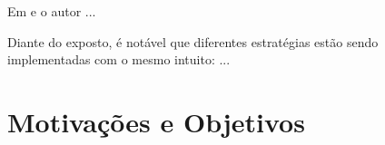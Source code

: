 Em \cite{Y_HORI_01} e \cite{Y_HORI_02} o autor ...


Diante do exposto, é notável que diferentes estratégias estão sendo implementadas com o mesmo intuito: ...

\section{Motivações e Objetivos}
\begin{comment}

Em robótica móvel (mas não apenas) é comum o uso de controladores que possuem como saída referências de velocidade de giro que devem ser aplicada aos conjuntos motor-roda do robô. Como por exemplo: controladores estabilizantes, seguidores de caminho e seguidores de trajetória. Portanto é essencial garantir que os motores tentem/consigam atingir essas velocidades, preferivelmente por meio do uso de controladores embarcados no robô. Com isso vem a necessidade do sensoriamento (\emph{Feedback}) e do processamento extra por parte do sistema embarcado do robô. O que pode se um problema em aplicações com baixo poder computacional e limitações no uso de sensores de alta precisão. Sejam essas limitações econômicas ou estruturais.\\


O objetivo geral deste trabalho é projetar e implementar um sistema embarcado capaz de controlar a rotação dos dois conjuntos motor-roda de um mini robô com acionamento diferencial e que utilize o filtro de \emph{Kalman} para melhorar a estimativa da velocidade proveniente da leitura de \emph{Encoders} de baixa resolução.\\

Para a validação do trabalho foi feito a implementação do sistema proposto, embarcado em robôs reais e feito análises da eficiência dos controladores com relação a diminuição das assimetrias dos conjuntos motor-roda, bem como a qualidade da filtragem/estimativa da velocidade. Os robôs utilizados foram desenvolvidos durante o trabalho e são voltados para a participação na \emph{Robocup} [?] na categoria \emph{IEEE Very Small Size Soccer} (VSSS) por meio da equipe Poti de Futebol de robôs do laboratório de robótica do Departamento de Computação e Automação (DCA) da UFRN, portanto, há limitações/desafios em seu projeto, principalmente com relação as suas dimensões, fazendo com que, por exemplo, seja difícil/inviável a utilização de \emph{Encoders} com alta precisão e o uso de \emph{Hardwares} com alto poder computacional.\\
\end{comment}
